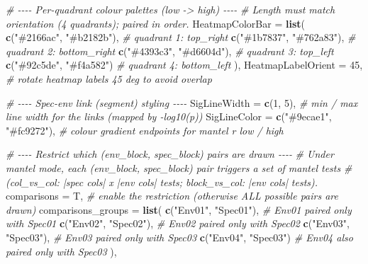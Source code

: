\documentclass[
]{book}
\newenvironment{Shaded}{\begin{snugshade}}{\end{snugshade}}
\newcommand{\AttributeTok}[1]{\textcolor[rgb]{0.13,0.29,0.53}{#1}}
\newcommand{\CommentTok}[1]{\textcolor[rgb]{0.56,0.35,0.01}{\textit{#1}}}
\newcommand{\DecValTok}[1]{\textcolor[rgb]{0.00,0.00,0.81}{#1}}
\newcommand{\FunctionTok}[1]{\textcolor[rgb]{0.13,0.29,0.53}{\textbf{#1}}}
\newcommand{\NormalTok}[1]{#1}
\newcommand{\StringTok}[1]{\textcolor[rgb]{0.31,0.60,0.02}{#1}}
\begin{document}
\begin{Shaded}
\begin{Highlighting}[]
  \CommentTok{\# {-}{-}{-}{-} Per{-}quadrant colour palettes (low {-}\textgreater{} high) {-}{-}{-}{-}}
  \CommentTok{\# Length must match \textasciigrave{}orientation\textasciigrave{} (4 quadrants); paired in order.}
  \AttributeTok{HeatmapColorBar    =} \FunctionTok{list}\NormalTok{(}
    \FunctionTok{c}\NormalTok{(}\StringTok{"\#2166ac"}\NormalTok{, }\StringTok{"\#b2182b"}\NormalTok{),                 }\CommentTok{\# quadrant 1: top\_right}
    \FunctionTok{c}\NormalTok{(}\StringTok{"\#1b7837"}\NormalTok{, }\StringTok{"\#762a83"}\NormalTok{),                 }\CommentTok{\# quadrant 2: bottom\_right}
    \FunctionTok{c}\NormalTok{(}\StringTok{"\#4393c3"}\NormalTok{, }\StringTok{"\#d6604d"}\NormalTok{),                 }\CommentTok{\# quadrant 3: top\_left}
    \FunctionTok{c}\NormalTok{(}\StringTok{"\#92c5de"}\NormalTok{, }\StringTok{"\#f4a582"}\NormalTok{)                  }\CommentTok{\# quadrant 4: bottom\_left}
\NormalTok{  ),}
  \AttributeTok{HeatmapLabelOrient =} \DecValTok{45}\NormalTok{,                   }\CommentTok{\# rotate heatmap labels 45 deg to avoid overlap}

  \CommentTok{\# {-}{-}{-}{-} Spec{-}env link (segment) styling {-}{-}{-}{-}}
  \AttributeTok{SigLineWidth       =} \FunctionTok{c}\NormalTok{(}\DecValTok{1}\NormalTok{, }\DecValTok{5}\NormalTok{),              }\CommentTok{\# min / max line width for the links (mapped by {-}log10(p))}
  \AttributeTok{SigLineColor       =} \FunctionTok{c}\NormalTok{(}\StringTok{"\#9ecae1"}\NormalTok{, }\StringTok{"\#fc9272"}\NormalTok{),  }\CommentTok{\# colour gradient endpoints for mantel r low / high}

  \CommentTok{\# {-}{-}{-}{-} Restrict which (env\_block, spec\_block) pairs are drawn {-}{-}{-}{-}}
  \CommentTok{\# Under mantel mode, each (env\_block, spec\_block) pair triggers a set of mantel tests}
  \CommentTok{\# (col\_vs\_col: |spec cols| x |env cols| tests; block\_vs\_col: |env cols| tests).}
  \AttributeTok{comparisons        =}\NormalTok{ T,                    }\CommentTok{\# enable the restriction (otherwise ALL possible pairs are drawn)}
  \AttributeTok{comparisons\_groups =} \FunctionTok{list}\NormalTok{(}
    \FunctionTok{c}\NormalTok{(}\StringTok{"Env01"}\NormalTok{, }\StringTok{"Spec01"}\NormalTok{),                    }\CommentTok{\# Env01 paired only with Spec01}
    \FunctionTok{c}\NormalTok{(}\StringTok{"Env02"}\NormalTok{, }\StringTok{"Spec02"}\NormalTok{),                    }\CommentTok{\# Env02 paired only with Spec02}
    \FunctionTok{c}\NormalTok{(}\StringTok{"Env03"}\NormalTok{, }\StringTok{"Spec03"}\NormalTok{),                    }\CommentTok{\# Env03 paired only with Spec03}
    \FunctionTok{c}\NormalTok{(}\StringTok{"Env04"}\NormalTok{, }\StringTok{"Spec03"}\NormalTok{)                     }\CommentTok{\# Env04 also paired only with Spec03}
\NormalTok{  ),}


\end{Highlighting}
\end{Shaded}
\end{document}
